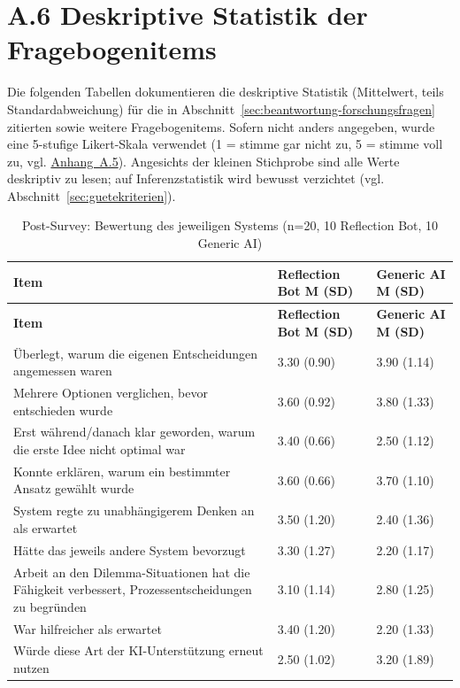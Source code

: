 \section*{A.6 Deskriptive Statistik der Fragebogenitems}
\label{app:statistik}

Die folgenden Tabellen dokumentieren die deskriptive Statistik (Mittelwert, teils Standardabweichung)
für die in Abschnitt~\ref{sec:beantwortung-forschungsfragen} zitierten sowie weitere Fragebogenitems.
Sofern nicht anders angegeben, wurde eine 5-stufige Likert-Skala verwendet (1 = stimme gar nicht zu,
5 = stimme voll zu, vgl. \hyperref[app:fragebogen]{Anhang~A.5}). Angesichts der kleinen Stichprobe sind alle Werte deskriptiv zu
lesen; auf Inferenzstatistik wird bewusst verzichtet (vgl. Abschnitt~\ref{sec:guetekriterien}).

\begingroup
\small
\setlength{\tabcolsep}{6pt}
\begin{longtable}{p{7.5cm} p{2.7cm} p{2.7cm}}
    \caption{Post-Survey: Bewertung des jeweiligen Systems (n=20, 10 Reflection Bot, 10 Generic AI)}
    \label{tab:survey-post-bewertung} \\
    \toprule
    \textbf{Item} & \textbf{Reflection Bot M (SD)} & \textbf{Generic AI M (SD)} \\
    \midrule
    \endfirsthead
    \toprule
    \textbf{Item} & \textbf{Reflection Bot M (SD)} & \textbf{Generic AI M (SD)} \\
    \midrule
    \endhead
    \bottomrule
    \endfoot
    Überlegt, warum die eigenen Entscheidungen angemessen waren & 3.30 (0.90) & 3.90 (1.14) \\
    Mehrere Optionen verglichen, bevor entschieden wurde & 3.60 (0.92) & 3.80 (1.33) \\
    Erst während/danach klar geworden, warum die erste Idee nicht optimal war & 3.40 (0.66) & 2.50 (1.12) \\
    Konnte erklären, warum ein bestimmter Ansatz gewählt wurde & 3.60 (0.66) & 3.70 (1.10) \\
    System regte zu unabhängigerem Denken an als erwartet & 3.50 (1.20) & 2.40 (1.36) \\
    Hätte das jeweils andere System bevorzugt & 3.30 (1.27) & 2.20 (1.17) \\
    Arbeit an den Dilemma-Situationen hat die Fähigkeit verbessert, Prozessentscheidungen zu begründen & 3.10 (1.14) & 2.80 (1.25) \\
    War hilfreicher als erwartet & 3.40 (1.20) & 2.20 (1.33) \\
    Würde diese Art der KI-Unterstützung erneut nutzen & 2.50 (1.02) & 3.20 (1.89) \\
\end{longtable}
\endgroup

